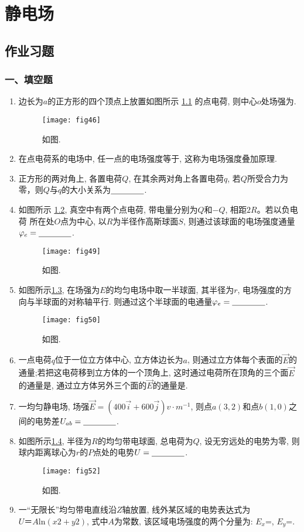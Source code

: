 \chapter{静电场}
\section{作业习题}
\subsection*{一、填空题}
\begin{enumerate}
    \item 边长为$a$的正方形的四个顶点上放置如图所示 \ref{fig:46} 的点电荷, 则中心$o$处场强为\nl.
    \begin{figure}[H]
        \centering
        \texttt{[image: fig46]}
        \caption{如图.}\label{fig:46}
    \end{figure}
    \item 在点电荷系的电场中, 任一点的电场强度等于\nl, 这称为电场强度叠加原理.
    \item 正方形的两对角上, 各置电荷$Q$, 在其余两对角上各置电荷$q$, 若$Q$所受合力为零，则$Q$与$q$的大小关系为$\nl$.
    \item   如图所示 \ref{fig:49}, 真空中有两个点电荷, 带电量分别为$Q$和$-Q$, 相距$2R$。若以负电荷
    所在处$O$点为中心, 以$R$为半径作高斯球面$S$, 则通过该球面的电场强度通量$\varphi_e=\nl$. 
    \begin{figure}[H]
        \centering
        \texttt{[image: fig49]}
        \caption{如图.}\label{fig:49}
    \end{figure}
    \item 如图所示\ref{fig:50}, 在场强为$E$的均匀电场中取一半球面, 其半径为$r$, 电场强度的方向与半球面的对称轴平行. 则通过这个半球面的电通量$\varphi_e=\nl$.
    \begin{figure}[H]
        \centering
        \texttt{[image: fig50]}
        \caption{如图.}\label{fig:50}
    \end{figure}
    \item 一点电荷$q$位于一位立方体中心, 立方体边长为$a$, 则通过立方体每个表面的$\vec{E}$的通量\nl;若把这电荷移到立方体的一个顶角上, 这时通过电荷所在顶角的三个面$\vec{E}$的通量是\nl, 通过立方体另外三个面的$\vec{E}$的通量是\nl.
    \item 一均匀静电场, 场强$\vec{E}=(400\vec{i}+600\vec{j})v\cdot m^{-1}$, 则点$a(3, 2)$和点$b(1, 0)$之间的电势差$U_{ab}=\nl$.
    \item 如图所示\ref{fig:52}, 半径为$R$的均匀带电球面, 总电荷为$Q$, 设无穷远处的电势为零, 则球内距离球心为$r$的$P$点处的电势$U=\nl$. 
    \begin{figure}[H]
        \centering
        \texttt{[image: fig52]}
        \caption{如图.}\label{fig:52}
    \end{figure}
    \item 一“无限长”均匀带电直线沿$Z$轴放置, 线外某区域的电势表达式为$U＝A\mathrm{ln}(x2+y2)$, 式中$A$为常数, 该区域电场强度的两个分量为: $E_x$=\nl, $E_y$=\nl.
\end{enumerate}
